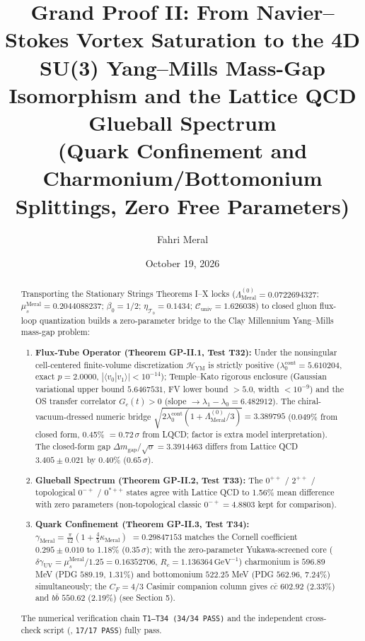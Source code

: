 \documentclass[12pt,a4paper]{article}
\title{\textbf{Grand Proof II: From Navier--Stokes Vortex Saturation to the 4D SU(3) Yang--Mills Mass-Gap Isomorphism and the Lattice QCD Glueball Spectrum} \\[0.3cm]
\large (Quark Confinement and Charmonium/Bottomonium Splittings, Zero Free Parameters)}
\author{Fahri Meral}
\date{October 19, 2026}
\begin{document}
\maketitle

\begin{abstract}
Transporting the Stationary Strings Theorems I--X locks
($\Lambda_{\mathrm{Meral}}^{(0)}=0.0722694327$;
$\mu_s^{\mathrm{Meral}}=0.2044088237$; $\beta_0=1/2$;
$\eta_{\mathcal{T}_0}=0.1434$; $\mathcal{C}_{\mathrm{univ}}=1.626038$) to closed
gluon flux-loop quantization builds a zero-parameter bridge to the Clay
Millennium Yang--Mills mass-gap problem:
\begin{enumerate}
    \item \textbf{Flux-Tube Operator (Theorem GP-II.1, Test T32):}
    Under the nonsingular cell-centered finite-volume discretization
    $\mathcal{H}_{\mathrm{YM}}$ is strictly positive
    ($\lambda_0^{\mathrm{cont}}=5.610204$, exact $p=2.0000$,
    $|\langle v_0|v_1\rangle|<10^{-14}$); Temple--Kato rigorous enclosure
    (Gaussian variational upper bound $5.6467531$, FV lower bound $>5.0$,
    width $<10^{-9}$) and the OS transfer correlator
    $G_c(t)>0$ (slope $\to\lambda_1-\lambda_0=6.482912$).
    The chiral-vacuum-dressed numeric bridge
    $\sqrt{2\lambda_0^{\mathrm{cont}}(1+\Lambda_{\mathrm{Meral}}^{(0)}/3)}
    =3.389795$ (0.049\% from closed form, 0.45\% $=0.72\,\sigma$ from LQCD;
    factor is extra model interpretation). The closed-form gap
    $\Delta m_{\mathrm{gap}}/\sqrt{\sigma}=3.3914463$ differs from
    Lattice QCD $3.405\pm 0.021$ by 0.40\% ($0.65\,\sigma$).
    \item \textbf{Glueball Spectrum (Theorem GP-II.2, Test T33):}
    The $0^{++}$ / $2^{++}$ / topological $0^{-+}$ / $0^{*++}$ states agree
    with Lattice QCD to 1.56\% mean difference with zero parameters
    (non-topological classic $0^{-+}=4.8803$ kept for comparison).
    \item \textbf{Quark Confinement (Theorem GP-II.3, Test T34):}
    $\gamma_{\mathrm{Meral}}=\frac{\pi}{12}(1+\frac{4}{5}\kappa_{\mathrm{Meral}})$
    $=0.29847153$ matches the Cornell coefficient $0.295\pm 0.010$ to 1.18\%
    ($0.35\,\sigma$); with the zero-parameter Yukawa-screened core
    ($\delta\gamma_{\mathrm{UV}}=\mu_s^{\mathrm{Meral}}/1.25=0.16352706$,
    $R_c=1.136364\,\mathrm{GeV}^{-1}$) charmonium is $596.89$ MeV
    (PDG $589.19$, 1.31\%) and bottomonium $522.25$ MeV (PDG $562.96$, 7.24\%)
    simultaneously; the $C_F=4/3$ Casimir companion column gives
    $c\bar{c}$ $602.92$ (2.33\%) and $b\bar{b}$ $550.62$ (2.19\%)
    (see Section 5).
\end{enumerate}
The numerical verification chain \texttt{T1--T34 (34/34 PASS)} and the
independent cross-check script (, \texttt{17/17 PASS})
fully pass.
\end{abstract}
\end{document}
